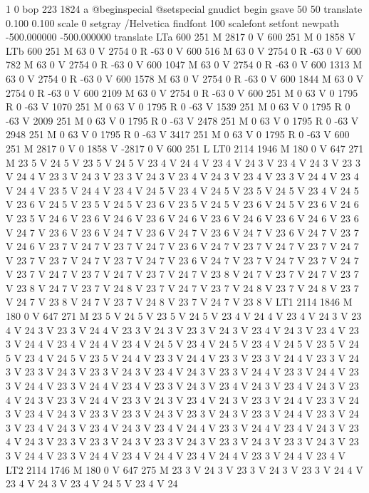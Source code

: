 1 0 bop 223 1824 a @beginspecial @setspecial
 gnudict begin gsave 50 50 translate 0.100 0.100 scale 0 setgray /Helvetica
findfont 100 scalefont setfont newpath -500.000000 -500.000000 translate
LTa 600 251 M 2817 0 V 600 251 M 0 1858 V LTb 600 251 M 63 0 V 2754
0 R -63 0 V 600 516 M 63 0 V 2754 0 R -63 0 V 600 782 M 63 0 V 2754
0 R -63 0 V 600 1047 M 63 0 V 2754 0 R -63 0 V 600 1313 M 63 0 V 2754
0 R -63 0 V 600 1578 M 63 0 V 2754 0 R -63 0 V 600 1844 M 63 0 V 2754
0 R -63 0 V 600 2109 M 63 0 V 2754 0 R -63 0 V 600 251 M 0 63 V 0 1795
R 0 -63 V 1070 251 M 0 63 V 0 1795 R 0 -63 V 1539 251 M 0 63 V 0 1795
R 0 -63 V 2009 251 M 0 63 V 0 1795 R 0 -63 V 2478 251 M 0 63 V 0 1795
R 0 -63 V 2948 251 M 0 63 V 0 1795 R 0 -63 V 3417 251 M 0 63 V 0 1795
R 0 -63 V 600 251 M 2817 0 V 0 1858 V -2817 0 V 600 251 L LT0 2114
1946 M 180 0 V 647 271 M 23 5 V 24 5 V 23 5 V 24 5 V 23 4 V 24 4 V
23 4 V 24 3 V 23 4 V 24 3 V 23 3 V 24 4 V 23 3 V 24 3 V 23 3 V 24 3
V 23 4 V 24 3 V 23 4 V 23 3 V 24 4 V 23 4 V 24 4 V 23 5 V 24 4 V 23
4 V 24 5 V 23 4 V 24 5 V 23 5 V 24 5 V 23 4 V 24 5 V 23 6 V 24 5 V
23 5 V 24 5 V 23 6 V 23 5 V 24 5 V 23 6 V 24 5 V 23 6 V 24 6 V 23 5
V 24 6 V 23 6 V 24 6 V 23 6 V 24 6 V 23 6 V 24 6 V 23 6 V 24 6 V 23
6 V 24 7 V 23 6 V 23 6 V 24 7 V 23 6 V 24 7 V 23 6 V 24 7 V 23 6 V
24 7 V 23 7 V 24 6 V 23 7 V 24 7 V 23 7 V 24 7 V 23 6 V 24 7 V 23 7
V 24 7 V 23 7 V 24 7 V 23 7 V 23 7 V 24 7 V 23 7 V 24 7 V 23 6 V 24
7 V 23 7 V 24 7 V 23 7 V 24 7 V 23 7 V 24 7 V 23 7 V 24 7 V 23 7 V
24 7 V 23 8 V 24 7 V 23 7 V 24 7 V 23 7 V 23 8 V 24 7 V 23 7 V 24 8
V 23 7 V 24 7 V 23 7 V 24 8 V 23 7 V 24 8 V 23 7 V 24 7 V 23 8 V 24
7 V 23 7 V 24 8 V 23 7 V 24 7 V 23 8 V LT1 2114 1846 M 180 0 V 647
271 M 23 5 V 24 5 V 23 5 V 24 5 V 23 4 V 24 4 V 23 4 V 24 3 V 23 4
V 24 3 V 23 3 V 24 4 V 23 3 V 24 3 V 23 3 V 24 3 V 23 4 V 24 3 V 23
4 V 23 3 V 24 4 V 23 4 V 24 4 V 23 4 V 24 5 V 23 4 V 24 5 V 23 4 V
24 5 V 23 5 V 24 5 V 23 4 V 24 5 V 23 5 V 24 4 V 23 3 V 24 4 V 23 3
V 23 3 V 24 4 V 23 3 V 24 3 V 23 3 V 24 3 V 23 3 V 24 3 V 23 4 V 24
3 V 23 3 V 24 4 V 23 3 V 24 4 V 23 3 V 24 4 V 23 3 V 24 4 V 23 4 V
23 3 V 24 3 V 23 4 V 24 3 V 23 4 V 24 3 V 23 4 V 24 3 V 23 3 V 24 4
V 23 3 V 24 3 V 23 4 V 24 3 V 23 3 V 24 4 V 23 3 V 24 3 V 23 4 V 24
3 V 23 3 V 23 3 V 24 3 V 23 3 V 24 3 V 23 3 V 24 4 V 23 3 V 24 3 V
23 4 V 24 3 V 23 4 V 24 3 V 23 4 V 24 4 V 23 3 V 24 4 V 23 4 V 24 3
V 23 4 V 24 3 V 23 3 V 23 3 V 24 3 V 23 3 V 24 3 V 23 3 V 24 3 V 23
3 V 24 3 V 23 3 V 24 4 V 23 3 V 24 4 V 23 4 V 24 4 V 23 4 V 24 4 V
23 3 V 24 4 V 23 4 V LT2 2114 1746 M 180 0 V 647 275 M 23 3 V 24 3
V 23 3 V 24 3 V 23 3 V 24 4 V 23 4 V 24 3 V 23 4 V 24 5 V 23 4 V 24
